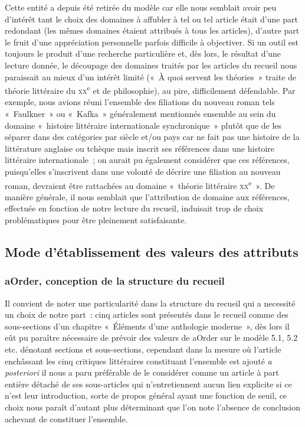 \documentclass[12pt, a4paper]{article}
\begin{document}
    Cette entité a depuis été retirée du modèle car elle nous semblait avoir peu d'intérêt tant le choix des domaines à affubler à tel ou tel article était d'une part redondant (les mêmes domaines étaient attribués à tous les articles), d'autre part le fruit d'une appréciation personnelle parfois difficile à objectiver. Si un outil est toujours le produit d'une recherche particulière et, dès lors, le résultat d'une lecture donnée, le découpage des domaines traités par les articles du recueil nous paraissait au mieux d'un intérêt limité («~À quoi servent les théories~» traite de théorie littéraire du \textsc{xx}\textsuperscript{e} et de philosophie), au pire, difficilement défendable. Par exemple, nous avions réuni l'ensemble des filiations du nouveau roman tels «~Faulkner~» ou «~Kafka~» généralement mentionnés ensemble au sein du domaine «~histoire littéraire internationale synchronique~» plutôt que de les séparer dans des catégories par siècle et/ou pays car \robbe{} ne fait pas une histoire de la littérature anglaise ou tchèque mais inscrit ses références dans une histoire littéraire internationale~; on aurait pu également considérer que ces références, puisqu'elles s'inscrivent dans une volonté de décrire une filiation au nouveau roman, devraient être rattachées au domaine «~théorie littéraire \textsc{xx}\textsuperscript{e}~». De manière générale, il nous semblait que l'attribution de domaine aux références, effectuée en fonction de notre lecture du recueil, induisait trop de choix problématiques pour être pleinement satisfaisante.


\subsection{Mode d'établissement des valeurs des attributs} 
\label{ref:dbEtabValeurs}
\subsubsection{aOrder, conception de la structure du recueil}
Il convient de noter une particularité dans la structure du recueil qui a necessité un choix de notre part~: cinq articles sont présentés dans le recueil comme des sous-sections d'un chapitre «~Éléments d'une anthologie moderne~», dès lors il eût pu paraître nécessaire de prévoir des valeurs de aOrder sur le modèle 5.1, 5.2 etc. dénotant sections et sous-sections, cependant dans la mesure où l'article enchâssant les cinq critiques littéraires constituant l'ensemble est ajouté \textit{a posteriori} il nous a paru préférable de le considérer comme un article à part entière détaché de ses sous-articles qui n'entretiennent aucun lien explicite si ce n'est leur introduction, sorte de propos général ayant une fonction de seuil, ce choix nous paraît d'autant plus déterminant que l'on note l'absence de conclusion achevant de constituer l'ensemble.
\end{document}
